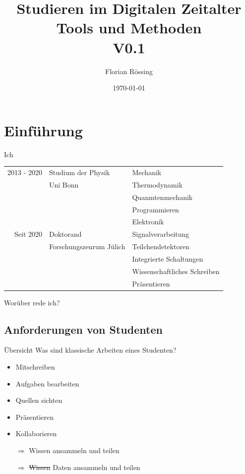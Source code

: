 \documentclass[aspectratio=169,shownotes]{beamer}
\title{Studieren im Digitalen Zeitalter \\\small Tools und Methoden\\ V0.1}
\author{Florian Rössing}
\date{\today}
\begin{document}
\maketitle

\section{Einführung}
\begin{frame}{Ich}
    \begin{table}
        \begin{tabularx}{\textwidth}{rll}
            
            2013 - 2020 & Studium der Physik & Mechanik\\
            & Uni Bonn & Thermodynamik\\
            & & Quanmtenmechanik\\
            & & Programmieren\\
            & & Elektronik\\
            Seit 2020 & Doktorand & Signalverarbeitung\\
            & Forschungszenrum Jülich & Teilchendetektoren\\
            & & Integrierte Schaltungen\\  
            & & Wissenschaftliches Schreiben \\
            & & Präsentieren \\
        \end{tabularx}
    \end{table}
\end{frame}

\begin{frame}{Worüber rede ich?}
\tableofcontents[sectionstyle=show,subsectionstyle=show/hide]
\end{frame}

\subsection{Anforderungen von Studenten}
\begin{frame}{Übersicht}
Was sind klassische Arbeiten eines Studenten?
    \begin{itemize}
        \item Mitschreiben \pause
        \item Aufgaben bearbeiten  \pause
        \item Quellen sichten  \pause
        \item Präsentieren  \pause
        \item Kollaborieren  \pause    
        \item[$\Rightarrow$] Wissen ansammeln und teilen  \pause
        \item[$\Rightarrow$] \sout{Wissen} Daten ansammeln und teilen   
    \end{itemize}
\end{frame}
\end{document}
